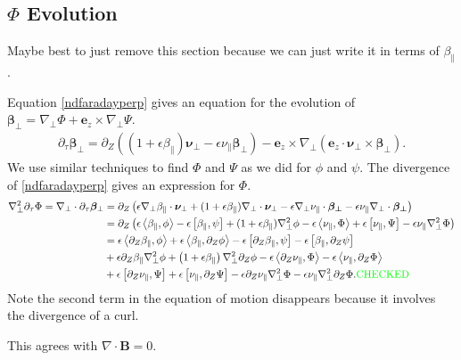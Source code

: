 \documentclass{article}
\newcommand{\para}{\parallel}
\newcommand{\ep}{\epsilon}
\newcommand{\np}{\nabla_\perp}
\newcommand{\p}{\partial}
\newcommand{\pth} [1] {\left( #1 \right) }
\newcommand{\br} [1] {\left[ #1 \right] }
\begin{document}
\subsection{$\Phi$ Evolution}
Maybe best to just remove this section because we can just write it in terms of $\beta_\para$. 

Equation \eqref{ndfaradayperp} gives an equation for the evolution of $\bm{\beta}_\perp = \np\Phi + \bm{e}_z\times\np\Psi$. 
\begin{align*} 
    \p_\tau\bm{\beta}_\perp = \p_Z \pth{\pth{1+\ep\beta_\para} \bm{\nu}_\perp - \ep\nu_\para \bm{\beta}_\perp} - \bm{e}_z \times \np \pth{\bm{e}_z \cdot \bm{\nu}_\perp \times \bm{\beta}_\perp}. 
\end{align*}
We use similar techniques to find $\Phi$ and $\Psi$ as we did for $\phi$ and $\psi$. The divergence of \eqref{ndfaradayperp} gives an expression for $\Phi$. 
\begin{align} \label{Phievolution} 
    \np^2\p_\tau\Phi = \np\cdot\p_\tau\bm{\beta}_\perp &= \p_Z \pth{\ep\np\beta_\para\cdot\bm{\nu}_\perp + (1+\ep\beta_\para) \np\cdot\bm{\nu}_\perp - \ep\np\nu_\para\cdot\bm{\beta_\perp} - \ep\nu_\para\np\cdot\bm{\beta_\perp}} \nonumber\\ 
    &= \p_Z\pth{\ep\Braket{\beta_\para, \phi} - \ep\br{\beta_\para, \psi} + (1+\ep\beta_\para) \np^2\phi - \ep\Braket{\nu_\para, \Phi} + \ep\br{\nu_\para, \Psi} -\ep\nu_\para\np^2\Phi} \nonumber\\ 
        &= \ep\Braket{\p_Z\beta_\para, \phi} + \ep\Braket{\beta_\para, \p_Z\phi} - \ep\br{\p_Z\beta_\para, \psi} - \ep\br{\beta_\para, \p_Z\psi} \nonumber\\ 
        &+ \ep\p_Z\beta_\para\np^2\phi + \pth{1+\ep\beta_\para}\np^2\p_Z\phi - \ep\Braket{\p_Z\nu_\para, \Phi} - \ep\Braket{\nu_\para, \p_Z\Phi} \nonumber\\ 
        &+ \ep\br{\p_Z\nu_\para, \Psi} + \ep\br{\nu_\para, \p_Z\Psi} - \ep\p_Z\nu_\para\np^2\Phi - \ep\nu_\para\np^2\p_Z\Phi. \text{\color{green}CHECKED} 
\end{align}
Note the second term in the equation of motion disappears because it involves the divergence of a curl. 

This agrees with $\nabla\cdot\bm{B}=0$. 
\end{document}
